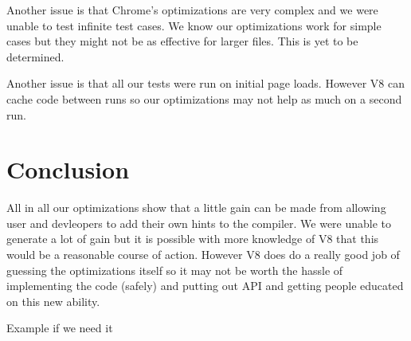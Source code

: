 \documentclass[twocolumn,showpacs,%
  nofootinbib,aps,superscriptaddress,%
  eqsecnum,prd,notitlepage,showkeys,10pt]{revtex4-1}
\begin{document}
Another issue is that Chrome's optimizations are very complex and we were unable to test infinite test cases. We know our optimizations work for simple cases but they might not be as effective for larger files. This is yet to be determined.

Another issue is that all our tests were run on initial page loads. However V8 can cache code between runs so our optimizations may not help as much on a second run.

\section{Conclusion}
All in all our optimizations show that a little gain can be made from allowing user and devleopers to add their own hints to the compiler. We were unable to generate a lot of gain but it is possible with more knowledge of V8 that this would be a reasonable course of action. However V8 does do a really good job of guessing the optimizations itself so it may not be worth the hassle of implementing the code (safely) and putting out API and getting people educated on this new ability. 





\begin{thebibliography}{9}

 Example if we need it





\end{thebibliography}
\end{document}
